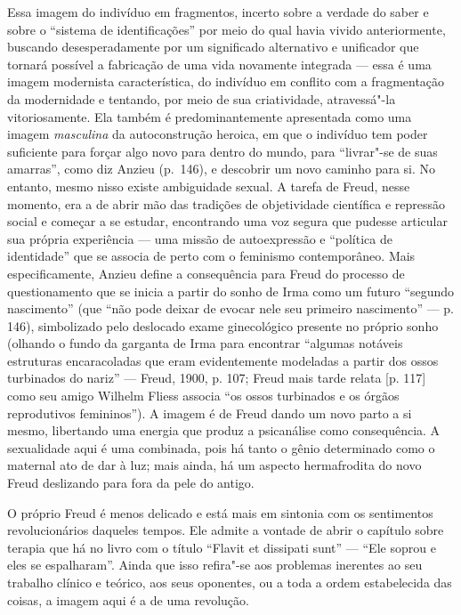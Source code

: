 Essa imagem do indivíduo em fragmentos, incerto sobre a verdade do saber
e sobre o ``sistema de identificações'' por meio do qual havia vivido
anteriormente, buscando desesperadamente por um significado alternativo
e unificador que tornará possível a fabricação de uma vida novamente
integrada --- essa é uma imagem modernista característica, do indivíduo
em conflito com a fragmentação da modernidade e tentando, por meio de
sua criatividade, atravessá"-la vitoriosamente. Ela também é
predominantemente apresentada como uma imagem \emph{masculina} da
autoconstrução heroica, em que o indivíduo tem poder suficiente para
forçar algo novo para dentro do mundo, para ``livrar"-se de suas
amarras'', como diz Anzieu (p.~146), e descobrir um novo caminho para si.
No entanto, mesmo nisso existe ambiguidade sexual. A tarefa de Freud,
nesse momento, era a de abrir mão das tradições de objetividade
científica e repressão social e começar a se estudar, encontrando uma
voz segura que pudesse articular sua própria experiência --- uma missão
de autoexpressão e ``política de identidade'' que se associa de perto
com o feminismo contemporâneo. Mais especificamente, Anzieu define a
consequência para Freud do processo de questionamento que se inicia a
partir do sonho de Irma como um futuro ``segundo nascimento'' (que ``não
pode deixar de evocar nele seu primeiro nascimento'' --- p. 146),
simbolizado pelo deslocado exame ginecológico presente no próprio sonho
(olhando o fundo da garganta de Irma para encontrar ``algumas notáveis
estruturas encaracoladas que eram evidentemente modeladas a partir dos
ossos turbinados do nariz'' --- Freud, 1900, p. 107; Freud mais tarde
relata {[}p. 117{]} como seu amigo Wilhelm Fliess associa ``os ossos
turbinados e os órgãos reprodutivos femininos''). A imagem é de Freud
dando um novo parto a si mesmo, libertando uma energia que produz a
psicanálise como consequência. A sexualidade aqui é uma combinada, pois
há tanto o gênio determinado como o maternal ato de dar à luz; mais
ainda, há um aspecto hermafrodita do novo Freud deslizando para fora da
pele do antigo.

O próprio Freud é menos delicado e está mais em sintonia com os
sentimentos revolucionários daqueles tempos. Ele admite a vontade de
abrir o capítulo sobre terapia que há no livro com o título ``Flavit et
dissipati sunt'' --- ``Ele soprou e eles se espalharam''. Ainda que isso
refira"-se aos problemas inerentes ao seu trabalho clínico e teórico, aos
seus oponentes, ou a toda a ordem estabelecida das coisas, a imagem aqui
é a de uma revolução.

